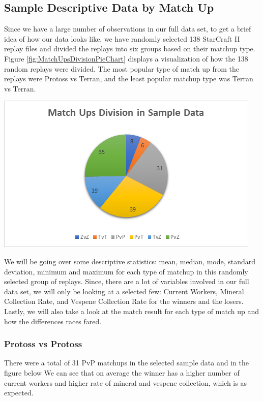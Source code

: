 \documentclass[a4paper,12pt]{report}
\begin{document}
\subsection{Sample Descriptive Data by Match Up}
Since we have a large number of observations in our full data set, to get a brief idea of how our data looks like, we have randomly selected 138 StarCraft II replay files and divided the replays into six groups based on their matchup type. Figure \ref{fig:MatchUpsDivisionPieChart} displays a visualization of how the 138 random replays were divided. The most popular type of match up from the replays were Protoss vs Terran, and the least popular matchup type was Terran vs Terran. 

\begin{center}
    \captionsetup{type=figure}
    \includegraphics[width=.9\linewidth]{media/MatchUpsDivisionPieChart.png}
    \label{fig:MatchUpsDivisionPieChart}
\end{center}

We will be going over some descriptive statistics: mean, median, mode, standard deviation, minimum and maximum for each type of matchup in this randomly selected group of replays. Since, there are a lot of variables involved in our full data set, we will only be looking at a selected few: Current Workers, Mineral Collection Rate, and Vespene Collection Rate for the winners and the losers. Lastly, we will also take a look at the match result for each type of match up and how the differences races fared. 

\subsubsection{Protoss vs Protoss}
There were a total of 31 PvP matchups in the selected sample data and in the figure below We can see that on average the winner has a higher number of current workers and higher rate of mineral and vespene collection, which is as expected. 
\end{document}
